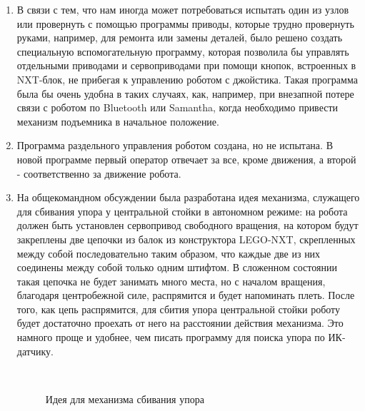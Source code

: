 \begin{enumerate}
\begin{enumerate}
		\item В связи с тем, что нам иногда может потребоваться испытать один из узлов или провернуть с помощью программы приводы, которые трудно провернуть руками, например, для ремонта или замены деталей, было решено создать специальную вспомогательную программу, которая позволила бы управлять отдельными приводами и сервоприводами при помощи кнопок, встроенных в NXT-блок, не прибегая к управлению роботом с джойстика. Такая программа была бы очень удобна в таких случаях, как, например, при внезапной потере связи с роботом по Bluetooth или Samantha, когда необходимо привести механизм подъемника в начальное положение.\newline
		
		\item Программа раздельного управления роботом создана, но не испытана. В новой программе первый оператор отвечает за все, кроме движения, а второй - соответственно за движение робота.\newline
		
		\item На общекомандном обсуждении была разработана идея механизма, служащего для сбивания упора у центральной стойки в автономном режиме: на робота должен быть установлен сервопривод свободного вращения, на котором будут закреплены две цепочки из балок из конструктора LEGO-NXT, скрепленных между собой последовательно таким образом, что каждые две из них соединены между собой только одним штифтом. В сложенном состоянии такая цепочка не будет занимать много места, но с началом вращения, благодаря центробежной силе, распрямится и будет напоминать плеть. После того, как цепь распрямится, для сбития упора центральной стойки роботу будет достаточно проехать от него на расстоянии действия механизма. Это намного проще и удобнее, чем писать программу для поиска упора по ИК-датчику.\newline
		
		\begin{figure}[H]
			\begin{minipage}[h]{0.2\linewidth}
				\center  
			\end{minipage}
			\begin{minipage}[h]{0.6\linewidth}
				\caption{Идея для механизма сбивания упора}
			\end{minipage}
		\end{figure}
		

\end{enumerate}
\end{enumerate}
